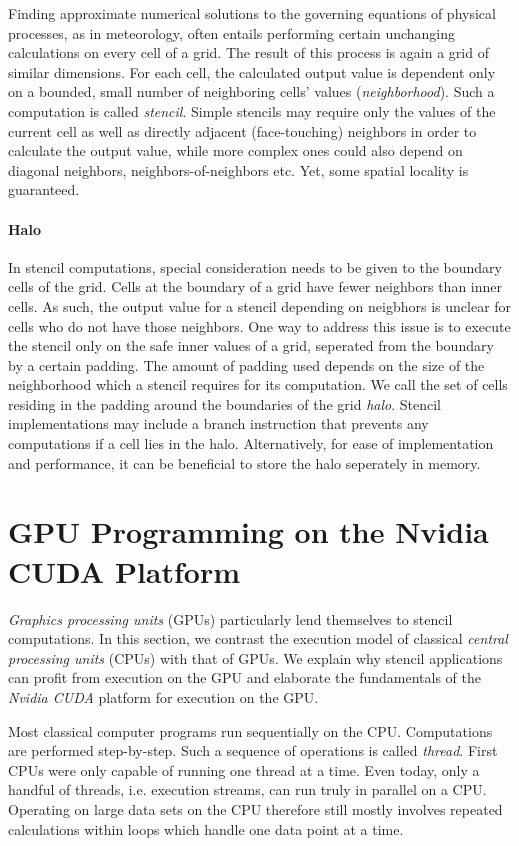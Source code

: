 Finding approximate numerical solutions to the governing equations of physical processes, as in meteorology, often entails performing certain unchanging calculations on every cell of a grid. The result of this process is again a grid of similar dimensions. For each cell, the calculated output value is dependent only on a bounded, small number of neighboring cells' values (\emph{neighborhood}). Such a computation is called \emph{stencil}. Simple stencils may require only the values of the current cell as well as directly adjacent (face-touching) neighbors in order to calculate the output value, while more complex ones could also depend on diagonal neighbors, neighbors-of-neighbors etc. Yet, some spatial locality is guaranteed. 

\paragraph{Halo} \label{sec:halo} In stencil computations, special consideration needs to be given to the boundary cells of the grid. Cells at the boundary of a grid have fewer neighbors than inner cells. As such, the output value for a stencil depending on neigbhors is unclear for cells who do not have those neighbors. One way to address this issue is to execute the stencil only on the safe inner values of a grid, seperated from the boundary by a certain padding. The amount of padding used depends on the size of the neighborhood which a stencil requires for its computation. We call the set of cells residing in the padding around the boundaries of the grid \emph{halo}. Stencil implementations may include a branch instruction that prevents any computations if a cell lies in the halo. Alternatively, for ease of implementation and performance, it can be beneficial to store the halo seperately in memory.

\section{GPU Programming on the Nvidia CUDA Platform}

\emph{Graphics processing units} (GPUs) particularly lend themselves to stencil computations. In this section, we contrast the execution model of classical \emph{central processing units} (CPUs) with that of GPUs. We explain why stencil applications can profit from execution on the GPU and elaborate the fundamentals of the \emph{Nvidia CUDA} platform for execution on the GPU.

Most classical computer programs run sequentially on the CPU. Computations are performed step-by-step. Such a sequence of operations is called \emph{thread}. First CPUs were only capable of running one thread at a time. Even today, only a handful of threads, i.e. execution streams, can run truly in parallel on a CPU. Operating on large data sets on the CPU therefore still mostly involves repeated calculations within loops which handle one data point at a time.

